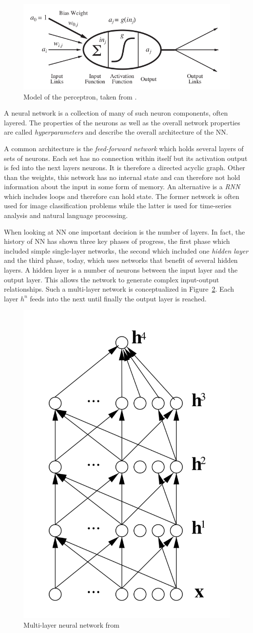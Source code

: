 \begin{figure}[]
    \centering
    \includegraphics[width=0.8\linewidth]{img/perceptron.png}
	\caption{Model of the perceptron, taken from \cite[]{russell2016artificial}.}
    \label{fig:perceptron}
\end{figure}

A neural network is a collection of many of such neuron components, often layered. The properties of the neurons as well
as the overall network properties are called \emph{hyperparameters} and describe the overall architecture of the \ac{NN}.

A common architecture is the \emph{feed-forward network} which holds several layers of sets of neurons. Each set has no
connection within itself but its activation output is fed into the next layers neurons. It is therefore a directed
acyclic graph. Other than the weights, this network has no internal state and can therefore not hold information about
the input in some form of memory. An alternative is a \emph{\acl {RNN} } which includes loops and therefore can
hold state. The former network is often used for image classification problems while the latter is used for
time-series analysis and natural language processing.

When looking at \ac {NN} one important decision is the number of layers. In fact, the history of \acl{NN} has shown
three key phases of progress, the first phase which included simple single-layer networks, the second which included one
\emph{hidden layer} and the third phase, today, which uses networks that benefit of several hidden layers. A hidden
layer is a number of neurons between the input layer and the output layer. This allows the network to generate complex
input-output relationships. Such a multi-layer network is conceptualized in Figure~\ref{fig:multilayernn}. Each layer
$h^n$ feeds into the next until finally the output layer is reached. 

\begin{figure}[]
    \centering
    \includegraphics[width=0.3\linewidth]{img/multilayer_nn.png}
	\caption{Multi-layer neural network from \cite[]{bengio2009learning} }
    \label{fig:multilayernn}
\end{figure}

